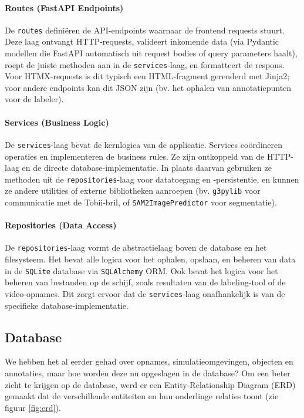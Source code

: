 \paragraph{Routes (FastAPI Endpoints)}
De \texttt{routes} definiëren de API-endpoints waarnaar de frontend requests stuurt.
Deze laag ontvangt HTTP-requests, valideert inkomende data 
(via Pydantic modellen die FastAPI automatisch uit request bodies of query parameters haalt), 
roept de juiste methoden aan in de \texttt{services}-laag, en formatteert de respons. 
Voor HTMX-requests is dit typisch een HTML-fragment gerenderd met Jinja2; voor andere endpoints kan dit JSON zijn 
(bv. het ophalen van annotatiepunten voor de labeler).

\paragraph{Services (Business Logic)}
De \texttt{services}-laag bevat de kernlogica van de applicatie.
Services coördineren operaties en implementeren de business rules. 
Ze zijn ontkoppeld van de HTTP-laag en de directe database-implementatie. 
In plaats daarvan gebruiken ze methoden uit de \texttt{repositories}-laag voor datatoegang en -persistentie, 
en kunnen ze andere utilities of externe bibliotheken aanroepen (bv. \texttt{g3pylib} voor communicatie met de Tobii-bril, of \texttt{SAM2ImagePredictor} voor segmentatie).

\paragraph{Repositories (Data Access)}
De \texttt{repositories}-laag vormt de abstractielaag boven de database en het filesysteem.
Het bevat alle logica voor het ophalen, opslaan, en beheren van data in de \texttt{SQLite} database via \texttt{SQLAlchemy} ORM.
Ook bevat het logica voor het beheren van bestanden op de schijf, zoals resultaten van de labeling-tool of de video-opnames.
Dit zorgt ervoor dat de \texttt{services}-laag onafhankelijk is van de specifieke database-implementatie.

\subsection{Database}

We hebben het al eerder gehad over opnames, simulatieomgevingen, objecten en annotaties, maar hoe worden deze nu opgeslagen in de database?
Om een beter zicht te krijgen op de database, werd er een Entity-Relationship Diagram (ERD) gemaakt dat de verschillende entiteiten en hun onderlinge relaties toont (zie figuur \ref{fig:erd}).

